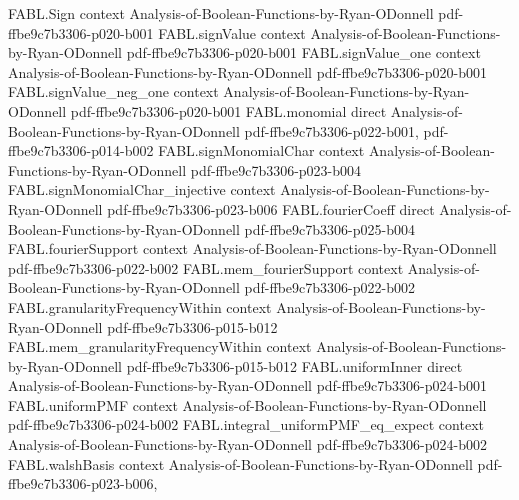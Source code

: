 \begin{theorem}
\label{FABL.productMean_uniform_majority_odd_eq_zero}
\leanok
{}
\proofstep
  {FABL.Sign}
  {context}
  {Analysis-of-Boolean-Functions-by-Ryan-ODonnell}
  {pdf-ffbe9c7b3306-p020-b001}
\proofstep
  {FABL.signValue}
  {context}
  {Analysis-of-Boolean-Functions-by-Ryan-ODonnell}
  {pdf-ffbe9c7b3306-p020-b001}
\proofstep
  {FABL.signValue_one}
  {context}
  {Analysis-of-Boolean-Functions-by-Ryan-ODonnell}
  {pdf-ffbe9c7b3306-p020-b001}
\proofstep
  {FABL.signValue_neg_one}
  {context}
  {Analysis-of-Boolean-Functions-by-Ryan-ODonnell}
  {pdf-ffbe9c7b3306-p020-b001}
\proofstep
  {FABL.monomial}
  {direct}
  {Analysis-of-Boolean-Functions-by-Ryan-ODonnell}
  {pdf-ffbe9c7b3306-p022-b001,
    pdf-ffbe9c7b3306-p014-b002}
\proofstep
  {FABL.signMonomialChar}
  {context}
  {Analysis-of-Boolean-Functions-by-Ryan-ODonnell}
  {pdf-ffbe9c7b3306-p023-b004}
\proofstep
  {FABL.signMonomialChar_injective}
  {context}
  {Analysis-of-Boolean-Functions-by-Ryan-ODonnell}
  {pdf-ffbe9c7b3306-p023-b006}
\proofstep
  {FABL.fourierCoeff}
  {direct}
  {Analysis-of-Boolean-Functions-by-Ryan-ODonnell}
  {pdf-ffbe9c7b3306-p025-b004}
\proofstep
  {FABL.fourierSupport}
  {context}
  {Analysis-of-Boolean-Functions-by-Ryan-ODonnell}
  {pdf-ffbe9c7b3306-p022-b002}
\proofstep
  {FABL.mem_fourierSupport}
  {context}
  {Analysis-of-Boolean-Functions-by-Ryan-ODonnell}
  {pdf-ffbe9c7b3306-p022-b002}
\proofstep
  {FABL.granularityFrequencyWithin}
  {context}
  {Analysis-of-Boolean-Functions-by-Ryan-ODonnell}
  {pdf-ffbe9c7b3306-p015-b012}
\proofstep
  {FABL.mem_granularityFrequencyWithin}
  {context}
  {Analysis-of-Boolean-Functions-by-Ryan-ODonnell}
  {pdf-ffbe9c7b3306-p015-b012}
\proofstep
  {FABL.uniformInner}
  {direct}
  {Analysis-of-Boolean-Functions-by-Ryan-ODonnell}
  {pdf-ffbe9c7b3306-p024-b001}
\proofstep
  {FABL.uniformPMF}
  {context}
  {Analysis-of-Boolean-Functions-by-Ryan-ODonnell}
  {pdf-ffbe9c7b3306-p024-b002}
\proofstep
  {FABL.integral_uniformPMF_eq_expect}
  {context}
  {Analysis-of-Boolean-Functions-by-Ryan-ODonnell}
  {pdf-ffbe9c7b3306-p024-b002}
\proofstep
  {FABL.walshBasis}
  {context}
  {Analysis-of-Boolean-Functions-by-Ryan-ODonnell}
  {pdf-ffbe9c7b3306-p023-b006,
}
\end{theorem}
